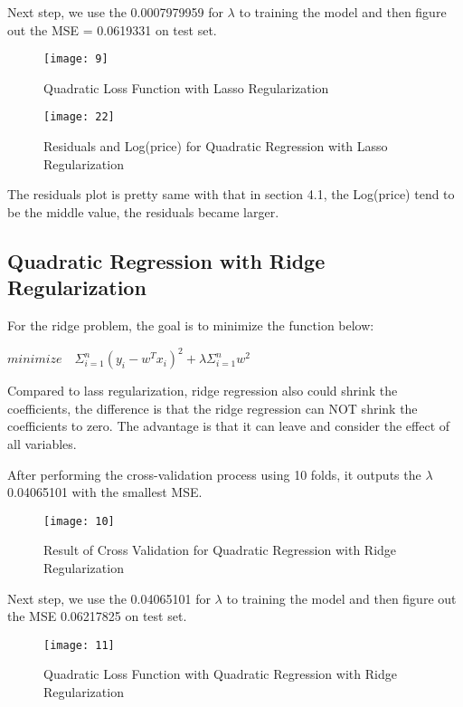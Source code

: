 \documentclass[12pt,twocolumn,twoside]{article}
\begin{document}
Next step, we use the 0.0007979959 for $\lambda$ to training the model and then figure out the MSE = 0.0619331 on test set.
\begin{figure}[h]
\texttt{[image: 9]}
\caption{Quadratic Loss Function with Lasso Regularization}
\end{figure}
\begin{figure}[h]
\texttt{[image: 22]}
\caption{Residuals and Log(price) for Quadratic Regression with Lasso Regularization}
\end{figure}
The residuals plot is pretty same with that in section 4.1, the Log(price) tend to be the middle value, the residuals became larger.
\subsection{Quadratic Regression with Ridge Regularization}
For the ridge problem, the goal is to minimize the function below:
\begin{center}
$minimize \quad \Sigma_{i=1}^n (y_i -w^T x_i)^2+\lambda \Sigma_{i=1}^n w^2$
\end{center}
Compared to lass regularization, ridge regression also could shrink the coefficients, the difference is that the ridge regression can NOT shrink the coefficients to zero. The advantage is that it can leave and consider the effect of all variables.

After performing the cross-validation process using 10 folds, it outputs the $\lambda$ 0.04065101 with the smallest MSE.
\begin{figure}[h]
\texttt{[image: 10]}
\caption{Result of Cross Validation for Quadratic Regression with Ridge Regularization}
\end{figure}
Next step, we use the 0.04065101 for $\lambda$ to training the model and then figure out the MSE 0.06217825 on test set.
\begin{figure}[h]
\texttt{[image: 11]}
\caption{Quadratic Loss Function with Quadratic Regression with Ridge Regularization}
\end{figure}
\end{document}
